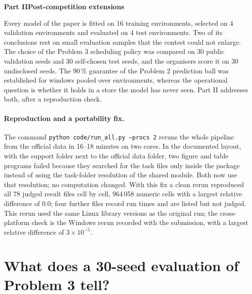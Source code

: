 \clearpage
{}

\setcounter{page}{1}
\begin{center}{\Large\bfseries Part II\quad Post-competition extensions}\end{center}

Every model of the paper is fitted on 16 training environments, selected on 4 validation environments and evaluated on 4 test environments. Two of its conclusions rest on small evaluation samples that the contest could not enlarge. The choice of the Problem 3 scheduling policy was compared on 30 public validation seeds and 30 self-chosen test seeds, and the organisers score it on 30 undisclosed seeds. The 90\,\% guarantee of the Problem 2 prediction ball was established for windows pooled over environments, whereas the operational question is whether it holds in a store the model has never seen. Part II addresses both, after a reproduction check.

\paragraph{Reproduction and a portability fix.} The command \texttt{python code/run\_all.py --procs 2} reruns the whole pipeline from the official data in 16--18 minutes on two cores. In the documented layout, with the support folder next to the official data folder, two figure and table programs failed because they searched for the task files only inside the package instead of using the task-folder resolution of the shared module. Both now use that resolution; no computation changed. With this fix a clean rerun reproduced all 78 judged result files cell by cell, 964\,058 numeric cells with a largest relative difference of 0.0; four further files record run times and are listed but not judged. This rerun used the same Linux library versions as the original run; the cross-platform check is the Windows rerun recorded with the submission, with a largest relative difference of $3\times10^{-5}$.

\section{What does a 30-seed evaluation of Problem 3 tell?}


